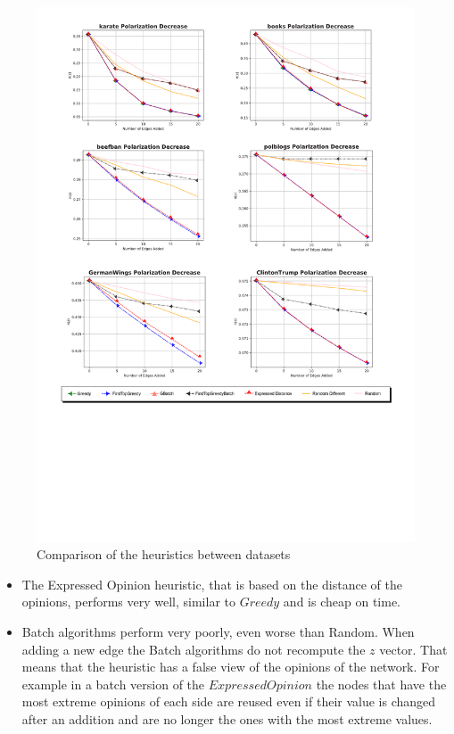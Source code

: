 \begin{figure}[!htbp]
	\begin{center}
	\advance\leftskip-1.3cm
	\captionsetup{justification=centering,margin=2cm}
	\includegraphics[width=1.2\textwidth]{Figures/heuristics}
	\caption{Comparison of the heuristics between datasets}
	\label{fig:heuristics_small}
	\end{center}
\end{figure}
\clearpage

\begin{itemize}
  \item The Expressed Opinion heuristic, that is based on the distance of the opinions, performs very well, similar to $Greedy$ and is cheap on time.
  \item Batch algorithms perform very poorly, even worse than Random. When adding a new edge the Batch algorithms do not recompute the $z$ vector. That means that the heuristic has a false view of the opinions of the network. For example in a batch version of the $ExpressedOpinion$ the nodes that have the most extreme opinions of each side are reused even if their value is changed after an addition and are no longer the ones with the most extreme values.
 \end{itemize}
 
